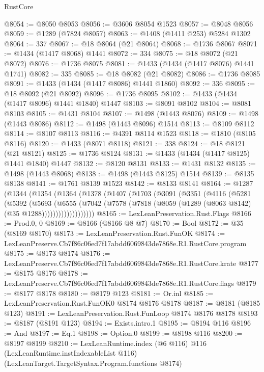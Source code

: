 \begin{lexlean}{RustCore}
\begin{coremodule}
@8054 := @8050 @8053
@8056 := @3606 @8054 @1523
@8057 := @8048 @8056
@8059 := @1289 (@7824 @8057)
@8063 := @1408 (@1411 @253) @5284 @1302
@8064 := 337
@8067 := @18 @8064 (@21 @8064)
@8068 := @1736 @8067
@8071 := @1434 (@1417 @8068) @1441
@8072 := 334
@8075 := @18 @8072 (@21 @8072)
@8076 := @1736 @8075
@8081 := @1433 (@1434 (@1417 @8076) @1441 @1741)
@8082 := 335
@8085 := @18 @8082 (@21 @8082)
@8086 := @1736 @8085
@8091 := @1433 (@1434 (@1417 @8086) @1441 @1860)
@8092 := 336
@8095 := @18 @8092 (@21 @8092)
@8096 := @1736 @8095
@8102 := @1433 (@1434 (@1417 @8096) @1441 @1840) @1447
@8103 := @8091 @8102
@8104 := @8081 @8103
@8105 := @1431 @8104
@8107 := @1498 (@1443 @8076)
@8109 := @1498 (@1443 @8086)
@8112 := @1498 (@1443 @8096) @1514
@8113 := @8109 @8112
@8114 := @8107 @8113
@8116 := @4391 @8114 @1523
@8118 := @1810 (@8105 @8116)
@8120 := @1433 (@8071 @8118)
@8121 := 338
@8124 := @18 @8121 (@21 @8121)
@8125 := @1736 @8124
@8131 := @1433 (@1434 (@1417 @8125) @1441 @1840) @1447
@8132 := @8120 @8131
@8133 := @1431 @8132
@8135 := @1498 (@1443 @8068)
@8138 := @1498 (@1443 @8125) @1514
@8139 := @8135 @8138
@8141 := @1761 @8139 @1523
@8142 := @8133 @8141
@8164 := @1287
    (@1344
      (@1354
        (@1364
          (@1378
            (@1407
              (@1703
                (@3091
                  (@3351
                    (@4116
                      (@5281
                        (@5392
                          (@5693
                            (@6555
                              (@7042
                                (@7578
                                  (@7818 (@8059 (@1289 (@8063 @8142) (@35 @1288)))))))))))))))))))
@8165 := LexLeanPreservation.Rust.Flags
@8166 := Prod.{0, 0}
@8169 := @8166 (@8166 @8 @7)
@8170 := Bool
@8172 := @35 (@8169 @8170)
@8173 := LexLeanPreservation.Rust.FunOK
@8174 := LexLeanPreserve.Cb7f86c06ed7f17abdd6069843de7868e.R1.RustCore.program
@8175 := @8173 @8174
@8176 := LexLeanPreserve.Cb7f86c06ed7f17abdd6069843de7868e.R1.RustCore.krate
@8177 := @8175 @8176
@8178 := LexLeanPreserve.Cb7f86c06ed7f17abdd6069843de7868e.R1.RustCore.flags
@8179 := @8177 @8178
@8180 := @8179 @123
@8181 := Or.inl
@8185 := LexLeanPreservation.Rust.FunOK0 @8174 @8176 @8178
@8187 := @8181 (@8185 @123)
@8191 := LexLeanPreservation.Rust.FunLoop @8174 @8176 @8178
@8193 := @8187 (@8191 @123)
@8194 := Exists.intro.{1}
@8195 := @8194 @116
@8196 := And
@8197 := Eq.{1}
@8198 := Option.{0}
@8199 := @8198 @116
@8200 := @8197 @8199
@8210 := LexLeanRuntime.index
    (@6 @116)
    @116
    (LexLeanRuntime.instIndexableList @116)
    (LexLeanTarget.TargetSyntax.Program.functions @8174)

\end{coremodule}
\end{lexlean}
